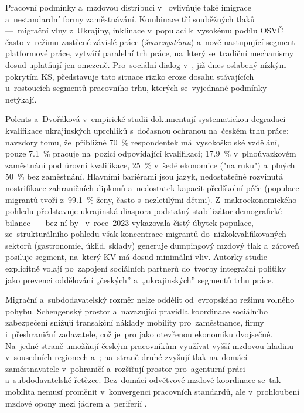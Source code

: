 
Pracovní podmínky a~mzdovou distribuci v~ ovlivňuje také imigrace a~nestandardní
formy zaměstnávání. Kombinace tří souběžných tlaků ---~migrační vlny z~Ukrajiny, inklinace
v~populaci k~vysokému podílu \acs{OSVČ} často v~režimu zastřené závislé práce (\emph{švarcsystému})
a~nově nastupující segment platformové práce, vytváří paralelní trh
práce, na~který se~tradiční mechanismy  dosud uplatňují jen
omezeně. Pro~sociální dialog v~, již dnes oslabený nízkým pokrytím \acs{KS},
představuje tato situace riziko eroze dosahu stávajících 
u~rostoucích segmentů pracovního trhu, kterých se~vyjednané podmínky netýkají.\par

Polents a~Dvořáková v~empirické studii dokumentují systematickou degradaci kvalifikace
ukrajinských uprchlíků s~dočasnou ochranou na~českém trhu práce: navzdory tomu,
že~přibližně \SI{70}{\percent} respondentek má~vysokoškolské vzdělání, pouze
\SI{7,1}{\percent} pracuje na~pozici odpovídající kvalifikaci; \SI{17,9}{\percent}
v~plnoúvazkovém zaměstnání pod úrovní kvalifikace, \SI{25}{\percent} v~šedé
ekonomice ("na ruku") a~plných \SI{50}{\percent} bez zaměstnání. Hlavními
bariérami jsou jazyk, nedostatečně rozvinutá nostrifikace zahraničních diplomů
a~nedostatek kapacit předškolní péče (populace migrantů
tvoří z~\SI{99,1}{\percent} ženy, často s~nezletilými dětmi). Z~makroekonomického
pohledu představuje ukrajinská diaspora podstatný stabilizátor demografické
bilance ---~bez ní by~ v~roce~2023 vykazovala čistý úbytek
populace, ze~strukturálního pohledu však koncentrace migrantů
do~nízkokvalifikovaných sektorů (gastronomie, úklid, sklady) generuje
dumpingový mzdový tlak a~zároveň posiluje segment, na~který \ac{KV} má dosud
minimální vliv. Autorky studie explicitně volají po~zapojení sociálních partnerů
do~tvorby integrační politiky jako prevenci oddělování „českých” a~„ukrajinských” segmentů trhu
práce.~\cite{PolentsDvorakova_UkraineRefugees2024}\par

Migrační a~subdodavatelský rozměr nelze oddělit od~evropského režimu volného pohybu. Schengenský prostor a~navazující pravidla koordinace sociálního zabezpečení snižují transakční náklady mobility pro~zaměstnance, firmy i~přeshraniční zadavatele, což je~pro  jako otevřenou ekonomiku dvojsečné. Na~jedné straně umožňují českým pracovníkům využívat vyšší mzdovou hladinu v~sousedních regionech  a~; na~straně druhé zvyšují tlak na~domácí zaměstnavatele v~pohraničí a~rozšiřují prostor pro~agenturní práci a~subdodavatelské řetězce. Bez~domácí odvětvové mzdové koordinace se~tak mobilita nemusí proměnit v~konvergenci pracovních standardů, ale v~prohloubení mzdové opony mezi jádrem a~periferií .~\cite{EC_WhitePaper_FutureOfEurope_2017}\par


